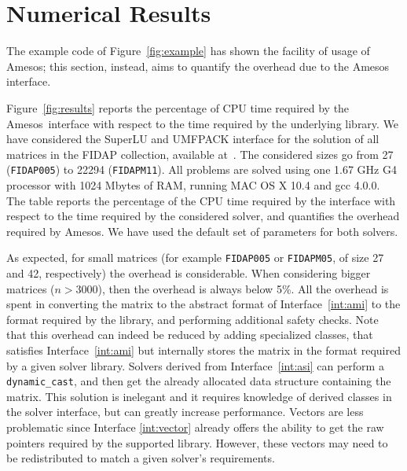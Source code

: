 \documentclass[acmtocl]{acmtrans2m}
\newcommand{\amesos}{{\sc Amesos}}
\begin{document}
\section{Numerical Results}
\label{sec:numerical}

The example code of Figure~\ref{fig:example} has shown the facility of usage
of Amesos; this section, instead, aims to quantify the overhead due to the
Amesos interface.

Figure~\ref{fig:results} reports the percentage of CPU time required by the
\amesos\ interface with respect to the time required by the underlying
library. We have considered the SuperLU and UMFPACK interface for the solution
of all matrices in the FIDAP collection, available
at~\cite{boisvert97matrix}. The considered sizes go from 27 
({\tt FIDAP005}) to 22294 ({\tt FIDAPM11}). All problems are solved using one
1.67 GHz G4 processor with 1024 Mbytes of RAM, running MAC OS X 10.4 and gcc
4.0.0. The table reports the percentage of the CPU time required by the
interface with respect to the time required by the considered solver, and
quantifies the overhead required by \amesos. We have used the default set of
parameters for both solvers.

As expected, for small matrices (for example \verb!FIDAP005! or \verb!FIDAPM05!, of size
27 and 42, respectively) 
the overhead is considerable. When considering bigger matrices ($n > 3000$),
then the overhead is  always below 5\%. All the overhead is spent in
converting the matrix to the abstract format of Interface~\ref{int:ami} to the
format required by the library, and performing additional safety checks.
Note that this overhead can indeed be reduced by adding specialized classes,
     that satisfies Interface~\ref{int:ami} but internally stores the matrix
     in the format required by a given solver library. Solvers derived from
     Interface~\ref{int:asi} can perform a {\tt dynamic\_cast}, and then get
     the already allocated data structure containing the matrix. This solution
     is inelegant and it requires knowledge of derived classes in the solver
     interface, but can greatly increase performance.  Vectors are less
     problematic since Interface \ref{int:vector} already offers the ability
     to get the raw pointers required by the supported library. However, these
     vectors may need to be redistributed to match a given solver's
     requirements.
\end{document}
